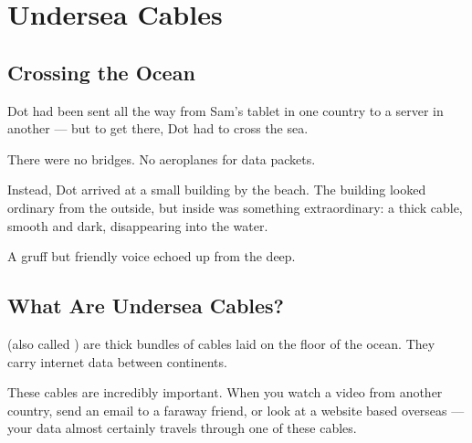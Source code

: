 
\chapter{Undersea Cables}


\section*{Crossing the Ocean}

Dot had been sent all the way from Sam's tablet in one country
to a server in another — but to get there, Dot had to cross the sea.

There were no bridges.
No aeroplanes for data packets.

Instead, Dot arrived at a small building by the beach.
The building looked ordinary from the outside, but inside was something extraordinary:
a thick cable, smooth and dark, disappearing into the water.

A gruff but friendly voice echoed up from the deep.


\sectionrule

\section*{What Are Undersea Cables?}

 (also called ) are thick bundles of cables
laid on the floor of the ocean.
They carry internet data between continents.

These cables are incredibly important.
When you watch a video from another country, send an email to a faraway friend,
or look at a website based overseas — your data almost certainly travels through one of these cables.

